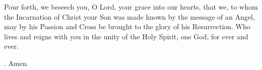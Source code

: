 \lettrine[lines=3]{P}{}our forth, we beseech you, O Lord,
your grace into our hearts,
that we, to whom the Incarnation of Christ your Son
was made known by the message of an Angel,
may by his Passion and Cross
be brought to the glory of his Resurrection.
Who lives and reigns with you in the unity of the Holy Spirit,
one God, for ever and ever. \par \Rbar. Amen.
